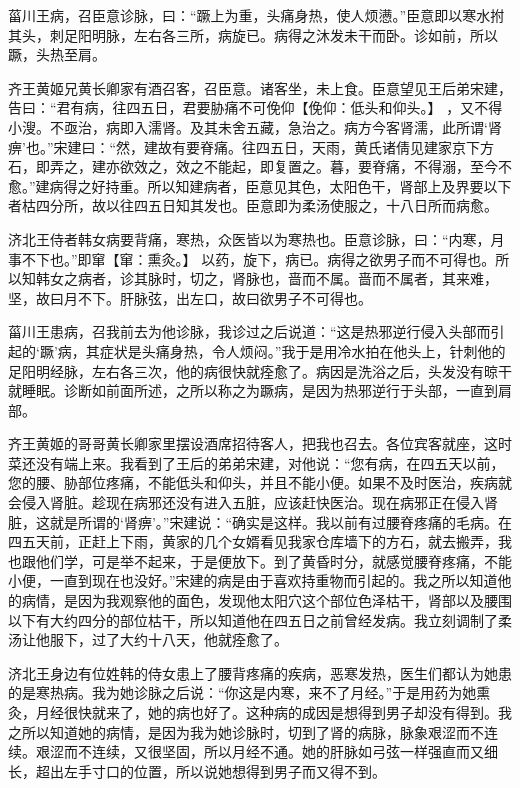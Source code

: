 \documentclass[12pt,UTF8]{ctexbook}
\begin{document}
菑川王病，召臣意诊脉，曰：“蹶上为重，头痛身热，使人烦懑。”臣意即以寒水拊其头，刺足阳明脉，左右各三所，病旋已。病得之沐发未干而卧。诊如前，所以蹶，头热至肩。

齐王黄姬兄黄长卿家有酒召客，召臣意。诸客坐，未上食。臣意望见王后弟宋建，告曰：“君有病，往四五日，君要胁痛不可俛仰【俛仰：低头和仰头。】 ，又不得小溲。不亟治，病即入濡肾。及其未舍五藏，急治之。病方今客肾濡，此所谓‘肾痹’也。”宋建曰：“然，建故有要脊痛。往四五日，天雨，黄氏诸倩见建家京下方石，即弄之，建亦欲效之，效之不能起，即复置之。暮，要脊痛，不得溺，至今不愈。”建病得之好持重。所以知建病者，臣意见其色，太阳色干，肾部上及界要以下者枯四分所，故以往四五日知其发也。臣意即为柔汤使服之，十八日所而病愈。

济北王侍者韩女病要背痛，寒热，众医皆以为寒热也。臣意诊脉，曰：“内寒，月事不下也。”即窜【窜：熏灸。】 以药，旋下，病已。病得之欲男子而不可得也。所以知韩女之病者，诊其脉时，切之，肾脉也，啬而不属。啬而不属者，其来难，坚，故曰月不下。肝脉弦，出左口，故曰欲男子不可得也。

菑川王患病，召我前去为他诊脉，我诊过之后说道：“这是热邪逆行侵入头部而引起的‘蹶’病，其症状是头痛身热，令人烦闷。”我于是用冷水拍在他头上，针刺他的足阳明经脉，左右各三次，他的病很快就痊愈了。病因是洗浴之后，头发没有晾干就睡眠。诊断如前面所述，之所以称之为蹶病，是因为热邪逆行于头部，一直到肩部。

齐王黄姬的哥哥黄长卿家里摆设酒席招待客人，把我也召去。各位宾客就座，这时菜还没有端上来。我看到了王后的弟弟宋建，对他说：“您有病，在四五天以前，您的腰、胁部位疼痛，不能低头和仰头，并且不能小便。如果不及时医治，疾病就会侵入肾脏。趁现在病邪还没有进入五脏，应该赶快医治。现在病邪正在侵入肾脏，这就是所谓的‘肾痹’。”宋建说：“确实是这样。我以前有过腰脊疼痛的毛病。在四五天前，正赶上下雨，黄家的几个女婿看见我家仓库墙下的方石，就去搬弄，我也跟他们学，可是举不起来，于是便放下。到了黄昏时分，就感觉腰脊疼痛，不能小便，一直到现在也没好。”宋建的病是由于喜欢持重物而引起的。我之所以知道他的病情，是因为我观察他的面色，发现他太阳穴这个部位色泽枯干，肾部以及腰围以下有大约四分的部位枯干，所以知道他在四五日之前曾经发病。我立刻调制了柔汤让他服下，过了大约十八天，他就痊愈了。

济北王身边有位姓韩的侍女患上了腰背疼痛的疾病，恶寒发热，医生们都认为她患的是寒热病。我为她诊脉之后说：“你这是内寒，来不了月经。”于是用药为她熏灸，月经很快就来了，她的病也好了。这种病的成因是想得到男子却没有得到。我之所以知道她的病情，是因为我为她诊脉时，切到了肾的病脉，脉象艰涩而不连续。艰涩而不连续，又很坚固，所以月经不通。她的肝脉如弓弦一样强直而又细长，超出左手寸口的位置，所以说她想得到男子而又得不到。
\end{document}
